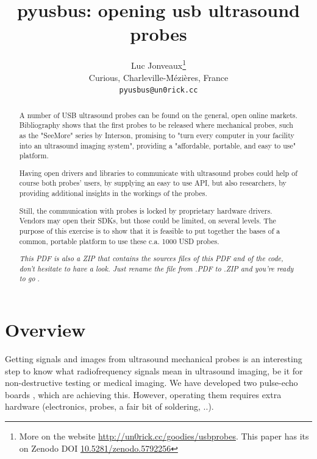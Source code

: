 \documentclass{article}
\title{pyusbus: opening usb ultrasound probes}
\author{
  Luc Jonveaux\thanks{More on the website \url{http://un0rick.cc/goodies/usbprobes}. This paper has its on Zenodo DOI  \href{http://doi.org/10.5281/zenodo.5792256}{10.5281/zenodo.5792256} } \\
  Curious, Charleville-Mézières, France\\
  \texttt{pyusbus@un0rick.cc} \\
}
\begin{document}
\maketitle

\begin{abstract}

A number of USB ultrasound probes can be found on the general, open online markets. Bibliography shows that the first probes to be released where mechanical probes, such as the "SeeMore" series by Interson, promising to "turn every computer in your facility into an ultrasound imaging system", providing a "affordable, portable, and easy to use" platform.

Having open drivers and libraries to communicate with ultrasound probes could help of course both probes' users, by supplying an easy to use API, but also researchers, by providing additional insights in the workings of the probes.

Still, the communication with probes is locked by proprietary hardware drivers.  Vendors may open their SDKs, but those could be limited, on several levels. The purpose of this exercise is to show that it is feasible to put together the bases of a common, portable platform to use these c.a. 1000 USD probes.


\emph{ This PDF is also a ZIP that contains the sources files of this PDF and of the code, don't hesitate to have a look. Just rename the file from .PDF to .ZIP and you're ready to go }.
\end{abstract}






\section{Overview}

Getting signals and images from ultrasound mechanical probes is an interesting step to know what radiofrequency signals mean in ultrasound imaging, be it for non-destructive testing or medical imaging. We have developed two pulse-echo boards \cite{un0rick,lit3rick}, which are achieving this. However, operating them requires extra hardware (electronics, probes, a fair bit of soldering, ..). 
\end{document}

